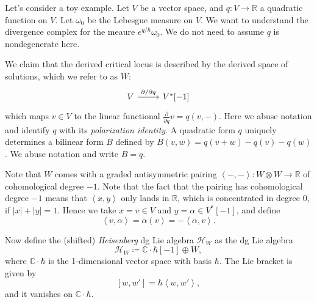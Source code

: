 \begin{example}\label{4.1.4}
Let's consider a toy example. Let $V$ be a vector space, and $q : V \to \mathbb{R} $ a quadratic function on $V$. Let $\omega _0$ be the Lebesgue measure on $V$. We want to understand the divergence complex for the meaure $e^{q/\hbar } \omega _0$. We do not need to assume $q$ is nondegenerate here.

We claim that the derived critical locus is described by the derived space of solutions, which we refer to as $W$:
\[\begin{tikzcd}[row sep = 2.5em, column sep = 2.5em]
	V\ar[" \partial / \partial q ", r]  & V^*[-1]
\end{tikzcd}\]
which maps $v\in V$ to the linear functional $\frac{\partial }{\partial q} v=q(v,-)$. Here we abuse notation and identify $q$ with its \emph{polarization identity}. A quadratic form $q$ uniquely determines a bilinear form $B$ defined by $B(v,w) = q(v+w) - q(v) - q(w)$. We abuse notation and write $B=q$.

Note that $W$ comes with a graded antisymmetric pairing $\left\langle -,- \right\rangle : W\otimes W \to \mathbb{R} $ of cohomological degree $-1$. Note that the fact that the pairing has cohomological degree $-1$ means that $\left\langle x,y \right\rangle $ only lands in $\mathbb{R} $, which is concentrated in degree 0, if $\left| x \right| +\left| y \right| =1$. Hence we take $x=v\in V$ and $y=\alpha \in V^*[-1]$, and define
\[
	\left\langle v,\alpha \right\rangle =\alpha (v) = -\left\langle \alpha ,v \right\rangle 
.\]

Now define the (shifted) \emph{Heisenberg} dg Lie algebra $\mathcal{H} _W$ as the dg Lie algebra
\[
	\mathcal{H} _W\coloneqq \mathbb{C} \cdot \hbar [-1]\oplus W,
\]
where $\mathbb{C} \cdot \hbar $ is the 1-dimensional vector space with basis $\hbar $. The Lie bracket is given by
\[
	[w,w']=\hbar \left\langle w,w' \right\rangle ,
\]
and it vanishes on $\mathbb{C} \cdot \hbar $.


\end{example}
